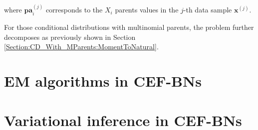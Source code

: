 \documentclass[11pt, oneside]{article}   	%
\newcommand{\bm}{\mathbf}
\numberwithin{figure}{section}
\numberwithin{equation}{section}
\numberwithin{table}{section}
\theoremstyle{definition}
\begin{document}
\noindent where $\bm{pa}^{(j)}_i$ corresponds to the $X_i$ parents values in the $j$-th data sample $\bm x^{(j)}$.

For those conditional distributions with multinomial parents, the problem further decomposes as previously shown in Section \ref{Section:CD_With_MParents:MomentToNatural}. 


%
%
%
%
%

\section{EM algorithms in CEF-BNs}


\section{Variational inference in CEF-BNs}
\end{document}
